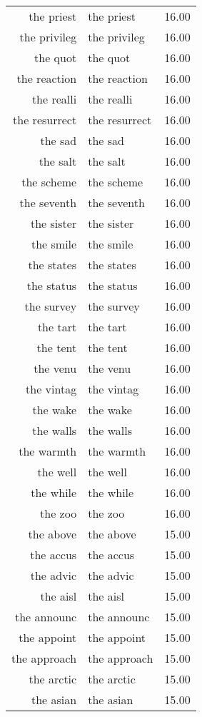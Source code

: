 \begin{table}[ht]
\begin{tabular}{rlr}
  the priest & the priest & 16.00 \\ 
  the privileg & the privileg & 16.00 \\ 
  the quot & the quot & 16.00 \\ 
  the reaction & the reaction & 16.00 \\ 
  the realli & the realli & 16.00 \\ 
  the resurrect & the resurrect & 16.00 \\ 
  the sad & the sad & 16.00 \\ 
  the salt & the salt & 16.00 \\ 
  the scheme & the scheme & 16.00 \\ 
  the seventh & the seventh & 16.00 \\ 
  the sister & the sister & 16.00 \\ 
  the smile & the smile & 16.00 \\ 
  the states & the states & 16.00 \\ 
  the status & the status & 16.00 \\ 
  the survey & the survey & 16.00 \\ 
  the tart & the tart & 16.00 \\ 
  the tent & the tent & 16.00 \\ 
  the venu & the venu & 16.00 \\ 
  the vintag & the vintag & 16.00 \\ 
  the wake & the wake & 16.00 \\ 
  the walls & the walls & 16.00 \\ 
  the warmth & the warmth & 16.00 \\ 
  the well & the well & 16.00 \\ 
  the while & the while & 16.00 \\ 
  the zoo & the zoo & 16.00 \\ 
  the above & the above & 15.00 \\ 
  the accus & the accus & 15.00 \\ 
  the advic & the advic & 15.00 \\ 
  the aisl & the aisl & 15.00 \\ 
  the announc & the announc & 15.00 \\ 
  the appoint & the appoint & 15.00 \\ 
  the approach & the approach & 15.00 \\ 
  the arctic & the arctic & 15.00 \\ 
  the asian & the asian & 15.00 \\ 

\end{tabular}
\end{table}
